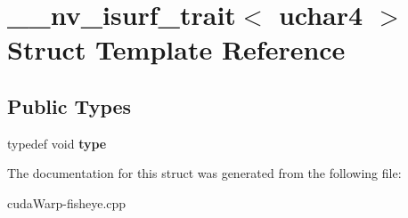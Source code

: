 \hypertarget{struct____nv__isurf__trait_3_01uchar4_01_4}{}\section{\+\_\+\+\_\+nv\+\_\+isurf\+\_\+trait$<$ uchar4 $>$ Struct Template Reference}
\label{struct____nv__isurf__trait_3_01uchar4_01_4}
\subsection*{Public Types}
\begin{DoxyCompactItemize}
\item 
typedef void {\bfseries type}\hypertarget{struct____nv__isurf__trait_3_01uchar4_01_4_a60c3a7be3faf3d7e6db0c6ff885d303b}{}\label{struct____nv__isurf__trait_3_01uchar4_01_4_a60c3a7be3faf3d7e6db0c6ff885d303b}

\end{DoxyCompactItemize}


The documentation for this struct was generated from the following file\+:\begin{DoxyCompactItemize}
\item 
cuda\+Warp-\/fisheye.\+cpp\end{DoxyCompactItemize}
